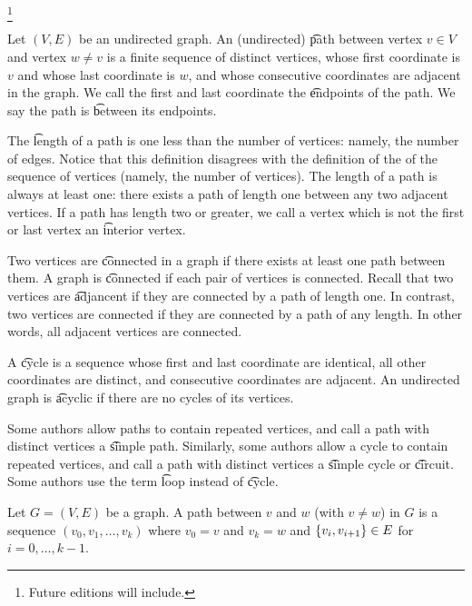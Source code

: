 
  \ifhmode\unskip\fi\footnote{
Future editions will include.
  }


Let $(V, E)$ be an undirected graph.
An (undirected) \t{path} between vertex $v \in V$ and vertex $w \neq v$ is a finite sequence of distinct vertices, whose first coordinate is $v$ and whose last coordinate is $w$, and whose consecutive coordinates are adjacent in the graph.
We call the first and last coordinate the \t{endpoints} of the path.
We say the path is \t{between} its endpoints.

The \t{length} of a path is one less than the number of vertices: namely, the number of edges.
Notice that this definition disagrees with the definition of the  of the sequence of vertices (namely, the number of vertices).
The length of a path is always at least one: there exists a path of length one between any two adjacent vertices.
If a path has length two or greater, we call a vertex which is not the first or last vertex an \t{interior vertex}.

Two vertices are \t{connected} in a graph if there exists at least one path between them.
A graph is \t{connected} if each pair of vertices is connected.
Recall that two vertices are \t{adjancent} if they are connected by a path of length one.
In contrast, two vertices are connected if they are connected by a path of any length.
In other words, all adjacent vertices are connected.

A \t{cycle} is a sequence whose first and last coordinate are identical, all other coordinates are distinct, and consecutive coordinates are adjacent.
An undirected graph is \t{acyclic} if there are no cycles of its vertices.


Some authors allow paths to contain repeated vertices, and call a path with distinct vertices a \t{simple path}.
Similarly, some authors allow a cycle to contain repeated vertices, and call a path with distinct vertices a \t{simple cycle} or \t{circuit}.
Some authors use the term \t{loop} instead of \t{cycle}.


Let $G = (V, E)$ be a graph.
A path between $v$ and $w$ (with $v \neq w$) in $G$ is a sequence $(v_0, v_1, \dots, v_k)$ where $v_0 = v$ and $v_k = w$ and $\{v_i, v_{i+1}\} \in E$ for $i = 0, \dots, k-1$.
